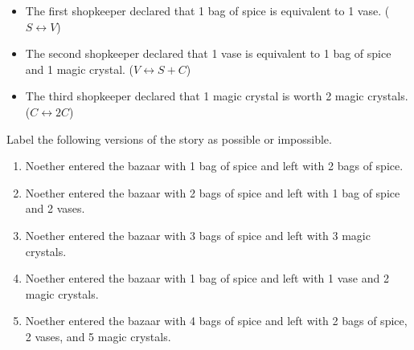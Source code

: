 \begin{itemize}
\item The first shopkeeper declared that 1 bag of spice is equivalent to 1 vase. (\(S \leftrightarrow V\))
\item The second shopkeeper declared that 1 vase is equivalent to 1 bag of spice and 1 magic crystal. (\(V \leftrightarrow S + C\))
\item The third shopkeeper declared that 1 magic crystal is worth 2 magic crystals. (\(C \leftrightarrow 2C\))
\end{itemize}

Label the following versions of the story as possible or impossible.
\begin{enumerate}
\item Noether entered the bazaar with 1 bag of spice and left with 2 bags of spice.
\item Noether entered the bazaar with 2 bags of spice and left with 1 bag of spice and 2 vases.
\item Noether entered the bazaar with 3 bags of spice and left with 3 magic crystals.
\item Noether entered the bazaar with 1 bag of spice and left with 1 vase and 2 magic crystals.
\item Noether entered the bazaar with 4 bags of spice and left with 2 bags of spice, 2 vases, and 5 magic crystals.
\end{enumerate}

